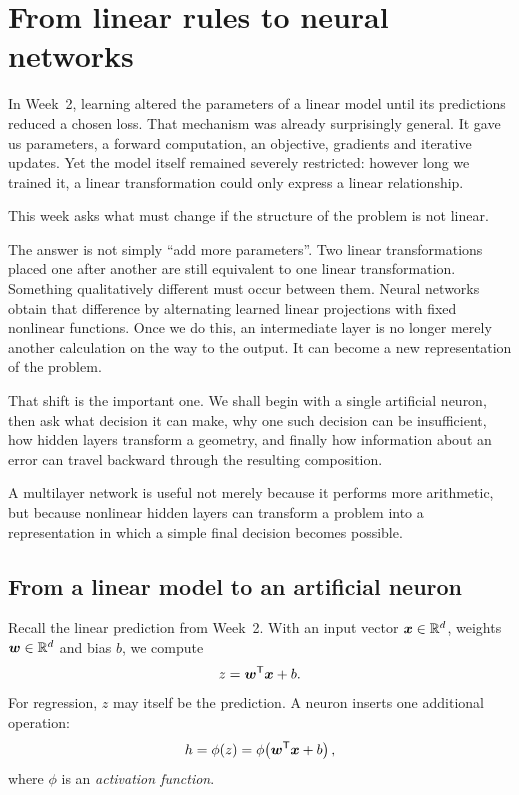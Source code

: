 \chapter{From linear rules to neural networks}
\label{chap:week03}

In Week~2, learning altered the parameters of a linear model until its predictions reduced a chosen loss. That mechanism was already surprisingly general. It gave us parameters, a forward computation, an objective, gradients and iterative updates. Yet the model itself remained severely restricted: however long we trained it, a linear transformation could only express a linear relationship.

This week asks what must change if the structure of the problem is not linear.

The answer is not simply ``add more parameters''. Two linear transformations placed one after another are still equivalent to one linear transformation. Something qualitatively different must occur between them. Neural networks obtain that difference by alternating learned linear projections with fixed nonlinear functions. Once we do this, an intermediate layer is no longer merely another calculation on the way to the output. It can become a new representation of the problem.

That shift is the important one. We shall begin with a single artificial neuron, then ask what decision it can make, why one such decision can be insufficient, how hidden layers transform a geometry, and finally how information about an error can travel backward through the resulting composition.

\begin{keyidea}
A multilayer network is useful not merely because it performs more arithmetic, but because nonlinear hidden layers can transform a problem into a representation in which a simple final decision becomes possible.
\end{keyidea}

\section{From a linear model to an artificial neuron}

Recall the linear prediction from Week~2. With an input vector \(\bm{x}\in\mathbb{R}^d\), weights \(\bm{w}\in\mathbb{R}^d\) and bias \(b\), we compute
\begin{equation}
  z = \bm{w}^{\mathsf T}\bm{x}+b.
  \label{eq:week3-preactivation}
\end{equation}
For regression, \(z\) may itself be the prediction. A neuron inserts one additional operation:
\begin{equation}
  h = \phi(z)
    = \phi\!\left(\bm{w}^{\mathsf T}\bm{x}+b\right),
  \label{eq:week3-neuron}
\end{equation}
where \(\phi\) is an \emph{activation function}.

